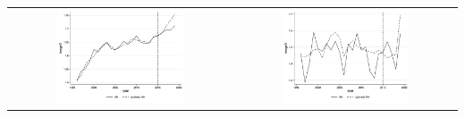 \documentclass[11pt]{article}
\begin{document}
{\begin{landscape}
\begin{table}[ht!]
\begin{tabular}{c c}
          \includegraphics[width = 0.6\textwidth, keepaspectratio]{figures/fin_synth_wf_wi.png} & \includegraphics[width = 0.6\textwidth, keepaspectratio]{figures/fin_synth_bf_wi.png}
    \end{tabular}
\end{table}
\end{landscape}

}
\end{document}
